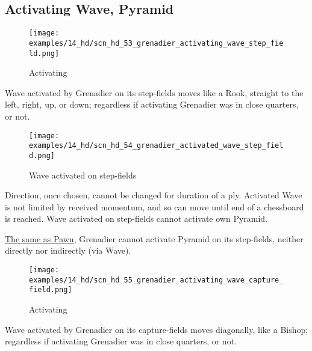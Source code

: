 \clearpage %

\subsection*{Activating Wave, Pyramid}
\label{sec:Hemera's Dawn/Grenadier/Activating Wave, Pyramid}

\vspace*{-1.1\baselineskip}
\noindent
\begin{wrapfigure}[6]{l}{0.4\textwidth}
\centering
\texttt{[image: examples/14\_hd/scn\_hd\_53\_grenadier\_activating\_wave\_step\_field.png]}
\vspace*{-0.5\baselineskip}
\caption{Activating}
\label{fig:scn_hd_53_grenadier_activating_wave_step_field}
\end{wrapfigure}
Wave activated by Grenadier on its step-fields moves like a Rook, straight to the
left, right, up, or down; regardless if activating Grenadier was in close quarters,
or not.

\vspace*{-1.1\baselineskip}
\noindent
\begin{figure}[!h]
\texttt{[image: examples/14\_hd/scn\_hd\_54\_grenadier\_activated\_wave\_step\_field.png]}
\vspace*{-1.4\baselineskip}
\caption{Wave activated on step-fields}
\label{fig:scn_hd_54_grenadier_activated_wave_step_field}
\end{figure}

\vspace*{-0.5\baselineskip}
Direction, once chosen, cannot be changed for duration of a ply. Activated
Wave is not limited by received momentum, and so can move until end of a
chessboard is reached. Wave activated on step-fields cannot activate own
Pyramid.

\hyperref[fig:scn_n_17_sideways_pawn_does_not_activate_pyramid]{The same as Pawn},
Grenadier cannot activate Pyramid on its step-fields, neither directly nor indirectly
(via Wave).

\clearpage %

\vspace*{-2.1\baselineskip}
\noindent
\begin{wrapfigure}[5]{l}{0.4\textwidth}
\centering
\texttt{[image: examples/14\_hd/scn\_hd\_55\_grenadier\_activating\_wave\_capture\_field.png]}
\vspace*{-0.5\baselineskip}
\caption{Activating}
\label{fig:scn_hd_55_grenadier_activating_wave_capture_field}
\end{wrapfigure}
Wave activated by Grenadier on its capture-fields moves diagonally, like a Bishop;
regardless if activating Grenadier was in close quarters, or not.

